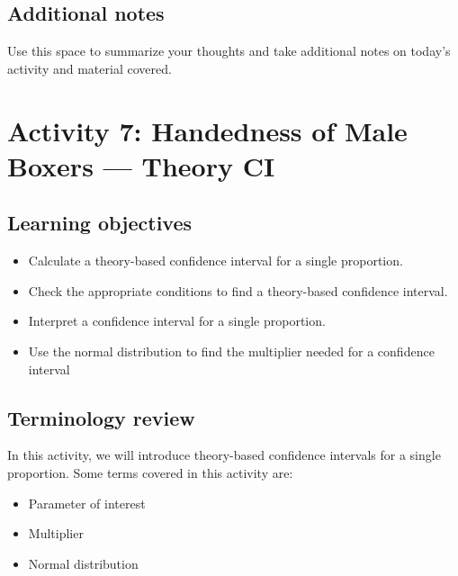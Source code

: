 \documentclass[
]{report}
\begin{document}
\hypertarget{additional-notes-10}{%
\subsection{Additional notes}\label{additional-notes-10}}

Use this space to summarize your thoughts and take additional notes on today's activity and material covered.

\newpage

\hypertarget{activity-7-handedness-of-male-boxers-theory-ci}{%
\section{Activity 7: Handedness of Male Boxers --- Theory CI}\label{activity-7-handedness-of-male-boxers-theory-ci}}


\hypertarget{learning-objectives}{%
\subsection{Learning objectives}\label{learning-objectives}}

\begin{itemize}
\item
  Calculate a theory-based confidence interval for a single proportion.
\item
  Check the appropriate conditions to find a theory-based confidence interval.
\item
  Interpret a confidence interval for a single proportion.
\item
  Use the normal distribution to find the multiplier needed for a confidence interval
\end{itemize}

\hypertarget{terminology-review-11}{%
\subsection{Terminology review}\label{terminology-review-11}}

In this activity, we will introduce theory-based confidence intervals for a single proportion. Some terms covered in this activity are:

\begin{itemize}
\item
  Parameter of interest
\item
  Multiplier
\item
  Normal distribution
\end{itemize}
\end{document}
